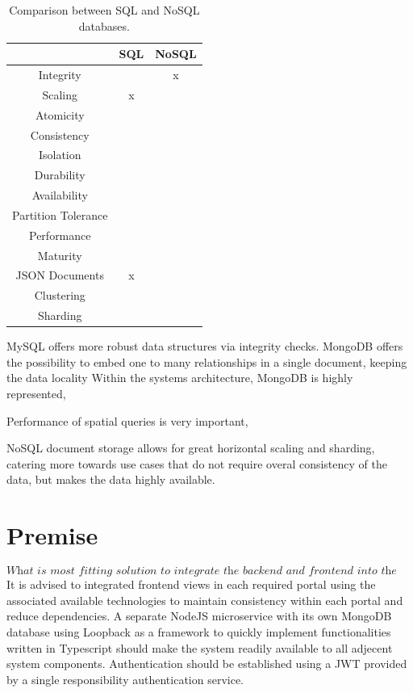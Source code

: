 \begin{table}[htbp!]
	\centering
	\begin{tabular}{c|c|c}
		\toprule
		& SQL & NoSQL \\
		\midrule
		Integrity & \checkmark\checkmark & x \\
		Scaling & x & \checkmark\checkmark \\
		Atomicity & \checkmark & \checkmark \\
		Consistency & \checkmark\checkmark & \checkmark \\
		Isolation & \checkmark & \checkmark \\
		Durability & \checkmark & \checkmark \\
		Availability & \checkmark & \checkmark\checkmark \\
		Partition Tolerance & \checkmark & \checkmark \\
		Performance & \checkmark & \checkmark\checkmark \\
		Maturity & \checkmark\checkmark & \checkmark \\
		JSON Documents & x & \checkmark \\
		Clustering & \checkmark & \checkmark \\
		Sharding & \checkmark & \checkmark\checkmark \\
		\bottomrule
	\end{tabular}
	\caption[Databases Comparison]{Comparison between SQL and NoSQL databases.}
	\label{tab:databases-comparison}
\end{table}

MySQL offers more robust data structures via integrity checks. MongoDB offers the possibility to embed one to many relationships in a single document, keeping the data locality
Within the systems architecture, MongoDB is highly represented,




Performance of spatial queries is very important,


NoSQL document storage allows for great horizontal scaling and sharding, catering more towards use cases that do not require overal consistency of the data, but makes the data highly available.


%
\section{Premise}
\[\textit{What is most fitting solution to integrate the backend and frontend into the existing architecture?}\] \hfill
{}
It is advised to integrated frontend views in each required portal using the associated available technologies to maintain consistency within each portal and reduce dependencies. A separate NodeJS microservice with its own MongoDB database using Loopback as a framework to quickly implement functionalities written in Typescript should make the system readily available to all adjecent system components. Authentication should be established using a JWT provided by a single responsibility authentication service.
